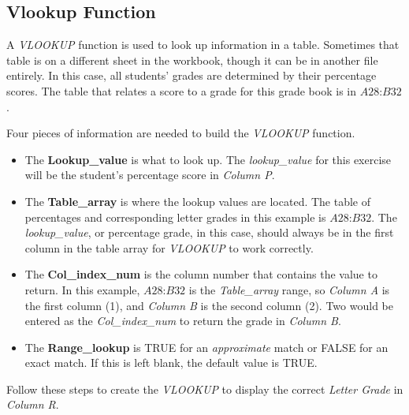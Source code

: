 \subsection{Vlookup Function}

A \textit{VLOOKUP} function is used to look up information in a table. Sometimes that table is on a different sheet in the workbook, though it can be in another file entirely. In this case, all students' grades are determined by their percentage scores. The table that relates a score to a grade for this grade book is in $ A28 $:$ B32 $.

Four pieces of information are needed to build the \textit{VLOOKUP} function. 

\begin{itemize}
	\item The \textbf{Lookup\_value} is what to look up. The \textit{lookup\_value} for this exercise will be the student's percentage score in \textit{Column P}.
	\item The \textbf{Table\_array} is where the lookup values are located. The table of percentages and corresponding letter grades in this example is $ A28 $:$ B32 $. The \textit{lookup\_value}, or percentage grade, in this case, should always be in the first column in the table array for \textit{VLOOKUP} to work correctly. 
	\item The \textbf{Col\_index\_num} is the column number that contains the value to return. In this example, $ A28 $:$ B32 $ is the \textit{Table\_array} range, so \textit{Column A} is the first column (1), and \textit{Column B} is the second column (2). Two would be entered as the \textit{Col\_index\_num} to return the grade in \textit{Column B}.
	\item The \textbf{Range\_lookup} is TRUE for an \textit{approximate} match or FALSE for an exact match. If this is left blank, the default value is TRUE.
\end{itemize}

Follow these steps to create the \textit{VLOOKUP} to display the correct \textit{Letter Grade} in \textit{Column R}.

